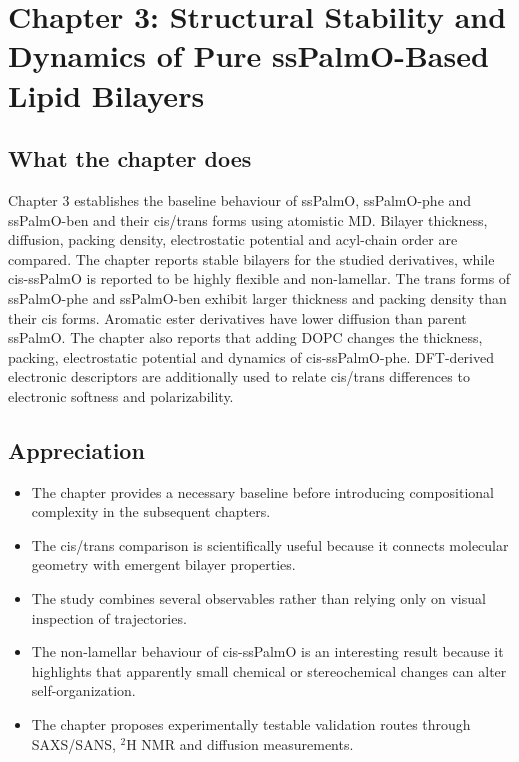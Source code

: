 \documentclass[11pt,a4paper]{article}
\begin{document}
\section{Chapter 3: Structural Stability and Dynamics of Pure ssPalmO-Based Lipid Bilayers}

\subsection*{What the chapter does}

Chapter 3 establishes the baseline behaviour of ssPalmO, ssPalmO-phe and ssPalmO-ben and their cis/trans forms using atomistic MD. Bilayer thickness, diffusion, packing density, electrostatic potential and acyl-chain order are compared. The chapter reports stable bilayers for the studied derivatives, while cis-ssPalmO is reported to be highly flexible and non-lamellar. The trans forms of ssPalmO-phe and ssPalmO-ben exhibit larger thickness and packing density than their cis forms. Aromatic ester derivatives have lower diffusion than parent ssPalmO. The chapter also reports that adding DOPC changes the thickness, packing, electrostatic potential and dynamics of cis-ssPalmO-phe. DFT-derived electronic descriptors are additionally used to relate cis/trans differences to electronic softness and polarizability.

\subsection*{Appreciation}

\begin{itemize}[leftmargin=*]
\item The chapter provides a necessary baseline before introducing compositional complexity in the subsequent chapters.
\item The cis/trans comparison is scientifically useful because it connects molecular geometry with emergent bilayer properties.
\item The study combines several observables rather than relying only on visual inspection of trajectories.
\item The non-lamellar behaviour of cis-ssPalmO is an interesting result because it highlights that apparently small chemical or stereochemical changes can alter self-organization.
\item The chapter proposes experimentally testable validation routes through SAXS/SANS, $^2$H NMR and diffusion measurements.
\end{itemize}
\end{document}
